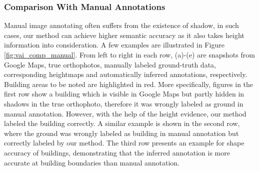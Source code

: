 \subsubsection{Comparison With Manual Annotations}
Manual image annotating often suffers from the existence of shadow, in such cases, our method can achieve higher semantic accuracy as it also takes height information into consideration. A few examples are illustrated in Figure \ref{fig:vai_comp_manual}. From left to right in each row, (a)-(e) are snapshots from Google Maps, true orthophotos, manually labeled ground-truth data, corresponding heightmaps and automatically inferred annotations, respectively. Building areas to be noted are highlighted in red. More specifically, figures in the first row show a building which is visible in Google Maps but partly hidden in shadows in the true orthophoto, therefore it was wrongly labeled as ground in manual annotation. However, with the help of the height evidence, our method labeled the building correctly. A similar example is shown in the second row, where the ground was wrongly labeled as building in manual annotation but correctly labeled by our method. The third row presents an example for shape accuracy of buildings, demonstrating that the inferred annotation is more accurate at building boundaries than manual annotation.


